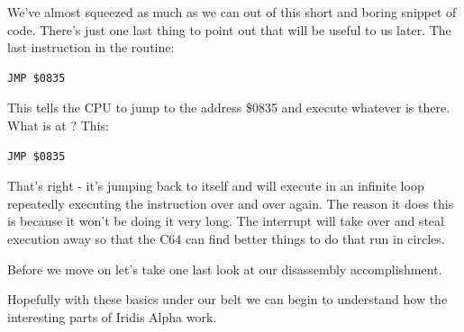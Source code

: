 We've almost squeezed as much as we can out of this short and boring snippet of code. There's just one last thing to point
out that will be useful to us later. The last instruction in the routine:

\begin{lstlisting}[caption=Jump.,escapechar=\%]
JMP $0835
\end{lstlisting}

This tells the CPU to jump to the address \$0835 and execute whatever is there. What is at ? This:

\begin{lstlisting}[caption=Hello again.,escapechar=\%]
JMP $0835
\end{lstlisting}

That's right - it's jumping back to itself and will execute in an infinite loop repeatedly executing the instruction
over and over again. The reason it does this is because it won't be doing it very long. The interrupt will take over
and steal execution away so that the C64 can find better things to do that run in circles.

Before we move on let's take one last look at our disassembly accomplishment.



Hopefully with these basics under our belt we can begin to understand how the interesting parts of Iridis Alpha work.

